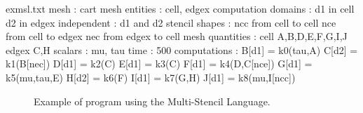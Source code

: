 \begin{filecontents*}{exmsl.txt}
mesh : cart
mesh entities : cell, edgex
computation domains :
  d1 in cell
  d2 in edgex
independent :
  d1 and d2
stencil shapes : 
  ncc from cell to cell
  nce from cell to edgex
  nec from edgex to cell
mesh quantities :
  cell A,B,D,E,F,G,I,J
  edgex C,H
scalars : mu, tau
time : 500
computations :
  B[d1] = k0(tau,A)
  C[d2] = k1(B[nec])
  D[d1] = k2(C)
  E[d1] = k3(C)
  F[d1] = k4(D,C[nce])
  G[d1] = k5(mu,tau,E)
  H[d2] = k6(F)
  I[d1] = k7(G,H)
  J[d1] = k8(mu,I[ncc])
\end{filecontents*}

\begin{figure}[!h]
  \hspace{5mm}
  \begin{minipage}[!h]{0.98\textwidth}
    {}   
    \caption{Example of program using the Multi-Stencil Language. \label{fig:exmsl}}
  \end{minipage}
\end{figure}

